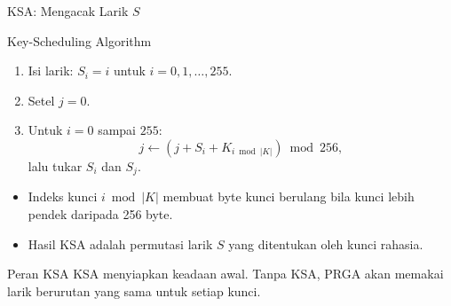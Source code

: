 \documentclass[aspectratio=169,11pt]{beamer}
\begin{document}
\begin{frame}{KSA: Mengacak Larik $S$}
    \footnotesize
    \begin{block}{Key-Scheduling Algorithm}
        \begin{enumerate}
            \item Isi larik: $S_i=i$ untuk $i=0,1,\dots,255$.
            \item Setel $j=0$.
            \item Untuk $i=0$ sampai $255$:
                  \[
                      j\leftarrow(j+S_i+K_{i\bmod |K|})\bmod 256,
                  \]
                  lalu tukar $S_i$ dan $S_j$.
        \end{enumerate}
    \end{block}
    \vspace{0.1cm}
    \begin{itemize}
        \item Indeks kunci $i\bmod |K|$ membuat byte kunci berulang bila
              kunci lebih pendek daripada 256 byte.
        \item Hasil KSA adalah permutasi larik $S$ yang ditentukan oleh
              kunci rahasia.
    \end{itemize}
    \begin{exampleblock}{Peran KSA}
        KSA menyiapkan keadaan awal. Tanpa KSA, PRGA akan memakai larik
        berurutan yang sama untuk setiap kunci.
    \end{exampleblock}
\end{frame}
\end{document}
